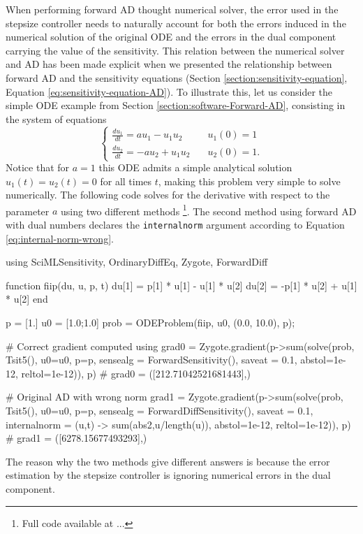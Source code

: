 When performing forward AD thought numerical solver, the error used in the stepsize controller needs to naturally account for both the errors induced in the numerical solution of the original ODE and the errors in the dual component carrying the value of the sensitivity. 
This relation between the numerical solver and AD has been made explicit when we presented the relationship between forward AD and the sensitivity equations (Section \ref{section:sensitivity-equation}, Equation \eqref{eq:sensitivity-equation-AD}). 
To illustrate this, let us consider the simple ODE example from Section \ref{section:software-Forward-AD}, consisting in the system of equations 
\begin{equation}
\begin{cases}
 \frac{du_1}{dt} = a u_1 - u_1 u_2 & \quad u_1(0) = 1  \\ 
 \frac{du_2}{dt} = - a u_2 + u_1 u_2 & \quad u_2(0) = 1.
\end{cases}
\end{equation}
Notice that for $a = 1$ this ODE admits a simple analytical solution $u_1(t) = u_2(t) = 0$ for all times $t$, making this problem very simple to solve numerically.
The following code solves for the derivative with respect to the parameter $a$ using two different methods \footnote{Full code available at ...}. 
The second method using forward AD with dual numbers declares the \texttt{internalnorm} argument according to Equation \eqref{eq:internal-norm-wrong}.
\begin{jllisting}
using SciMLSensitivity, OrdinaryDiffEq, Zygote, ForwardDiff

function fiip(du, u, p, t)
    du[1] =  p[1] * u[1] - u[1] * u[2]
    du[2] = -p[1] * u[2] + u[1] * u[2]
end

p = [1.]
u0 = [1.0;1.0]
prob = ODEProblem(fiip, u0, (0.0, 10.0), p);

# Correct gradient computed using 
grad0 = Zygote.gradient(p->sum(solve(prob, Tsit5(), u0=u0, p=p, sensealg = ForwardSensitivity(), saveat = 0.1, abstol=1e-12, reltol=1e-12)), p)
# grad0 = ([212.71042521681443],)

# Original AD with wrong norm 
grad1 = Zygote.gradient(p->sum(solve(prob, Tsit5(), u0=u0, p=p, sensealg = ForwardDiffSensitivity(), saveat = 0.1, internalnorm = (u,t) -> sum(abs2,u/length(u)), abstol=1e-12, reltol=1e-12)), p)
# grad1 = ([6278.15677493293],)
\end{jllisting}
The reason why the two methods give different answers is because the error estimation by the stepsize controller is ignoring numerical errors in the dual component. 

